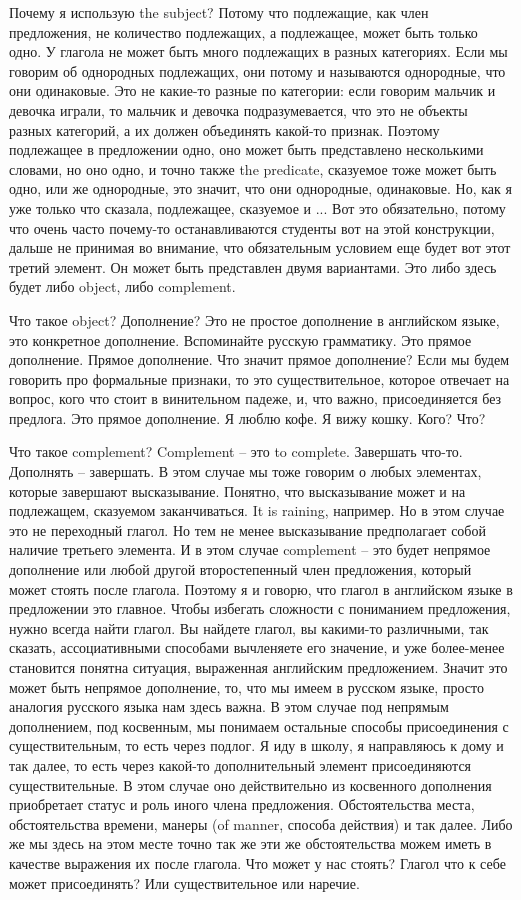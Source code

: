 \documentclass[main.tex]{subfiles}
\begin{document}
Почему я использую the subject?
Потому что подлежащие, как член предложения, не количество подлежащих, а подлежащее, может быть только одно.
У глагола не может быть много подлежащих в разных категориях.
Если мы говорим об однородных подлежащих, они потому и называются однородные, что они одинаковые.
Это не какие-то разные по категории: если говорим мальчик и девочка играли, то мальчик и девочка подразумевается, что это не объекты разных категорий, а их должен объединять какой-то признак.
Поэтому подлежащее в предложении одно, оно может быть представлено несколькими словами, но оно одно, и точно также the predicate, сказуемое тоже может быть одно, или же однородные, это значит, что они однородные, одинаковые.
Но, как я уже только что сказала, подлежащее, сказуемое и ...
Вот это обязательно, потому что очень часто почему-то останавливаются студенты вот на этой конструкции, дальше не принимая во внимание, что обязательным условием еще будет вот этот третий элемент.
Он может быть представлен двумя вариантами.
Это либо здесь будет либо object, либо complement.

Что такое object? Дополнение?
Это не простое дополнение в английском языке, это конкретное дополнение.
Вспоминайте русскую грамматику.
Это прямое дополнение.
Прямое дополнение.
Что значит прямое дополнение?
Если мы будем говорить про формальные признаки, то это существительное, которое отвечает на вопрос, кого что стоит в винительном падеже, и, что важно, присоединяется без предлога.
Это прямое дополнение.
Я люблю кофе.
Я вижу кошку.
Кого? Что?

Что такое complement?
Complement -- это to complete.
Завершать что-то.
Дополнять -- завершать.
В этом случае мы тоже говорим о любых элементах, которые завершают высказывание.
Понятно, что высказывание может и на подлежащем, сказуемом заканчиваться.
It is raining, например.
Но в этом случае это не переходный глагол.
Но тем не менее высказывание предполагает собой наличие третьего элемента.
И в этом случае complement -- это будет непрямое дополнение или любой другой второстепенный член предложения, который может стоять после глагола.
Поэтому я и говорю, что глагол в английском языке в предложении это главное.
Чтобы избегать сложности с пониманием предложения, нужно всегда найти глагол.
Вы найдете глагол, вы какими-то различными, так сказать, ассоциативными способами вычленяете его значение, и уже более-менее становится понятна ситуация, выраженная английским предложением.
Значит это может быть непрямое дополнение, то, что мы имеем в русском языке, просто аналогия русского языка нам здесь важна.
В этом случае под непрямым дополнением, под косвенным, мы понимаем остальные способы присоединения с существительным, то есть через подлог.
Я иду в школу, я направляюсь к дому и так далее, то есть через какой-то дополнительный элемент присоединяются существительные.
В этом случае оно действительно из косвенного дополнения приобретает статус и роль иного члена предложения.
Обстоятельства места, обстоятельства времени, манеры (of manner, способа действия) и так далее.
Либо же мы здесь на этом месте точно так же эти же обстоятельства можем иметь в качестве выражения их после глагола.
Что может у нас стоять?
Глагол что к себе может присоединять?
Или существительное или наречие.
\end{document}

